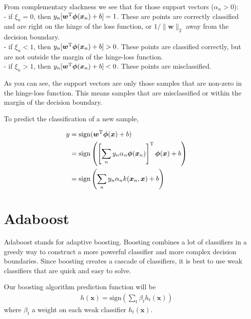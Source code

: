 \documentclass[11pt]{article}
\newcommand{\vct}[1]{\boldsymbol{#1}} %
\newcommand{\T}{^{\textrm T}} %
\begin{document}
From complementary slackness we see that for those support vectors ($\alpha_n >0$):\\
- if $\xi_n = 0$, then $y_{n}[\vct{w}\T \vct{\phi}(\vct{x}_{n}) + b] = 1$. These are points are correctly classified and are right on the hinge of the loss function, or $1/\|\vct{w}\|_2$ away from the decision boundary. \\
- if $\xi_n < 1$, then $y_{n}[\vct{w}\T \vct{\phi}(\vct{x}_{n}) + b] > 0$. These points are classified correctly, but are not outside the margin of the hinge-loss function.\\
- if $\xi_n > 1$, then $y_{n}[\vct{w}\T \vct{\phi}(\vct{x}_{n}) + b] < 0$. These points are misclassified.

As you can see, the support vectors are only those samples that are non-zero in the hinge-loss function. This means samples that are misclassified or within the margin of the decision boundary.

To predict the classification of a new sample, 

\begin{align*}
y &= \text{sign}(\vct{w}\T \vct{\phi}(\vct{x}) + b)\\
&= \text{sign}\left(\left[ \sum_{n} y_{n} \alpha_{n} \vct{\phi}(\vct{x}_{n})\right]\T \vct{\phi}(\vct{x}) + b\right)\\
&= \text{sign}\left( \sum_{n} y_{n} \alpha_{n} k(\vct{x}_{n},\vct{x}) + b\right)\\
\end{align*}



\section{Adaboost}
Adaboost stands for adaptive boosting. Boosting combines a lot of classifiers in a greedy way to construct a more powerful classifier and more complex decision boundaries. Since boosting creates a cascade of classifiers, it is best to use weak classifiers that are quick and easy to solve.

Our boosting algorithm prediction function will be
\begin{align*}
h(\vct{x}) = \text{sign}\left(\sum_t \beta_t h_t(\vct{x})\right)
\end{align*}
where $\beta_t$ a weight on each weak classifier $h_t(\vct{x})$.
\end{document}
